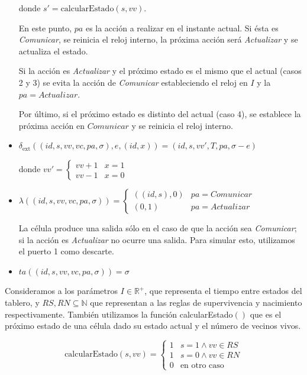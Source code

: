 \documentclass[12pt]{article}
\newcommand{\dext}{\delta_{\text{ext}}}
\newcommand{\estado}{(id, s, vv, vc, pa, \sigma)}
\newcommand{\R}{\mathbb{R}}
\newcommand{\N}{\mathbb{N}}
\begin{document}
\begin{itemize}
    donde $s' = \text{calcularEstado}(s, vv)$.

    En este punto, $pa$ es la acción a realizar en el instante actual. Si ésta es \textit{Comunicar}, se reinicia el reloj interno, la próxima acción será \textit{Actualizar} y se actualiza el estado.

    Si la acción es \textit{Actualizar} y el próximo estado es el mismo que el actual (casos 2 y 3) se evita la acción de \textit{Comunicar} estableciendo el reloj en $I$ y la $pa = Actualizar$.

    Por último, si el próximo estado es distinto del actual (caso 4), se establece la próxima acción en $Comunicar$ y se reinicia el reloj interno.

  \item $\dext(\estado, e, (id, x)) = (id, s, vv', T, pa, \sigma - e)$

    donde $vv' = \begin{cases}
      vv + 1 & x = 1 \\
      vv - 1 & x = 0
    \end{cases}$

  \item $\lambda(\estado) = \begin{cases}
      ((id, s), 0) & pa = Comunicar \\
      (0, 1) & pa = Actualizar
    \end{cases}$

    La célula produce una salida sólo en el caso de que la acción sea \textit{Comunicar}; si la acción es \textit{Actualizar} no ocurre una salida. Para simular esto, utilizamos el puerto 1 como descarte.

  \item $ta(\estado) = \sigma$
\end{itemize}

Consideramos a los parámetros $I \in \R^+$, que representa el tiempo entre estados del tablero, y $RS, RN \subseteq \N$ que representan a las reglas de supervivencia y nacimiento respectivamente. También utilizamos la función calcularEstado$()$ que es el próximo estado de una célula dado su estado actual y el número de vecinos vivos.

\[ \text{calcularEstado}(s, vv) = \begin{cases}
  1 & s = 1 \land vv \in RS \\
  1 & s = 0 \land vv \in RN \\
  0 & \text{en otro caso}
\end{cases}\]
\end{document}
